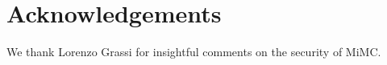 
\chapter*{Acknowledgements}

We thank Lorenzo Grassi for insightful comments on the security of MiMC.